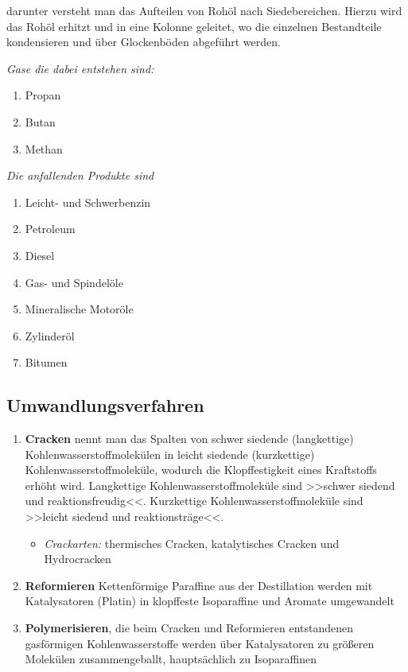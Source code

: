 darunter versteht man das Aufteilen von Rohöl nach Siedebereichen.
Hierzu wird das Rohöl erhitzt und in eine Kolonne geleitet, wo die
einzelnen Bestandteile kondensieren und über Glockenböden abgeführt
werden.

\emph{Gase die dabei entstehen sind:}

\begin{enumerate}
\item
  Propan
\item
  Butan
\item
  Methan
\end{enumerate}

\emph{Die anfallenden Produkte sind}

\begin{enumerate}
\item
  Leicht- und Schwerbenzin
\item
  Petroleum
\item
  Diesel
\item
  Gas- und Spindelöle
\item
  Mineralische Motoröle
\item
  Zylinderöl
\item
  Bitumen
\end{enumerate}

\subsection{Umwandlungsverfahren}\label{umwandlungsverfahren}

\begin{enumerate}
\item
  \textbf{Cracken} nennt man das Spalten von schwer siedende
  (langkettige) Kohlenwasserstoffmolekülen in leicht siedende
  (kurzkettige) Kohlenwasserstoffmoleküle, wodurch die Klopffestigkeit
  eines Kraftstoffs erhöht wird. Langkettige Kohlenwasserstoffmoleküle
  sind >>schwer siedend und reaktionsfreudig<<. Kurzkettige
  Kohlenwasserstoffmoleküle sind >>leicht siedend und reaktionsträge<<.

  \begin{itemize}
  \item
    \emph{Crackarten:} thermisches Cracken, katalytisches Cracken und
    Hydrocracken
  \end{itemize}
\item
  \textbf{Reformieren} Kettenförmige Paraffine aus der Destillation
  werden mit Katalysatoren (Platin) in klopffeste Isoparaffine und
  Aromate umgewandelt
\item
  \textbf{Polymerisieren}, die beim Cracken und Reformieren entstandenen
  gasförmigen Kohlenwasserstoffe werden über Katalysatoren zu größeren
  Molekülen zusammengeballt, hauptsächlich zu Isoparaffinen
\end{enumerate}

